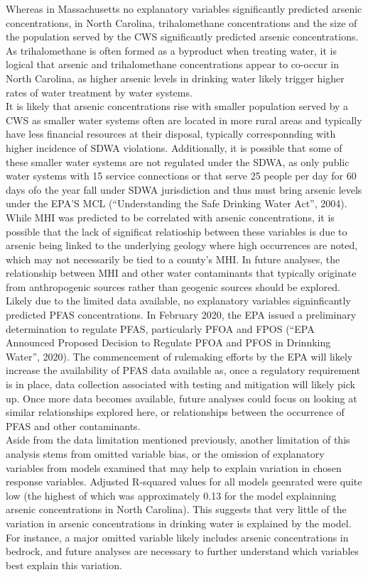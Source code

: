 \documentclass[12pt,]{article}
\begin{document}
Whereas in Massachusetts no explanatory variables significantly
predicted arsenic concentrations, in North Carolina, trihalomethane
concentrations and the size of the population served by the CWS
significantly predicted arsenic concentrations. As trihalomethane is
often formed as a byproduct when treating water, it is logical that
arsenic and trihalomethane concentrations appear to co-occur in North
Carolina, as higher arsenic levels in drinking water likely trigger
higher rates of water treatment by water systems.\\
It is likely that arsenic concentrations rise with smaller population
served by a CWS as smaller water systems often are located in more rural
areas and typically have less financial resources at their disposal,
typically corresponnding with higher incidence of SDWA violations.
Additionally, it is possible that some of these smaller water systems
are not regulated under the SDWA, as only public water systems with 15
service connections or that serve 25 people per day for 60 days ofo the
year fall under SDWA jurisdiction and thus must bring arsenic levels
under the EPA'S MCL (``Understanding the Safe Drinking Water Act'',
2004).\\
While MHI was predicted to be correlated with arsenic concentrations, it
is possible that the lack of significat relatioship between these
variables is due to arsenic being linked to the underlying geology where
high occurrences are noted, which may not necessarily be tied to a
county's MHI. In future analyses, the relationship between MHI and other
water contaminants that typically originate from anthropogenic sources
rather than geogenic sources should be explored.\\
Likely due to the limited data available, no explanatory variables
signinficantly predicted PFAS concentrations. In February 2020, the EPA
issued a preliminary determination to regulate PFAS, particularly PFOA
and FPOS (``EPA Announced Proposed Decision to Regulate PFOA and PFOS in
Drinnking Water'', 2020). The commencement of rulemaking efforts by the
EPA will likely increase the availability of PFAS data available as,
once a regulatory requirement is in place, data collection associated
with testing and mitigation will likely pick up. Once more data becomes
available, future analyses could focus on looking at similar
relationships explored here, or relationships between the occurrence of
PFAS and other contaminants.\\
Aside from the data limitation mentioned previously, another limitation
of this analysis stems from omitted variable bias, or the omission of
explanatory variables from models examined that may help to explain
variation in chosen response variables. Adjusted R-squared values for
all models geenrated were quite low (the highest of which was
approximately 0.13 for the model explainning arsenic concentrations in
North Carolina). This suggests that very little of the variation in
arsenic concentrations in drinking water is explained by the model. For
instance, a major omitted variable likely includes arsenic
concentrations in bedrock, and future analyses are necessary to further
understand which variables best explain this variation.
\end{document}
